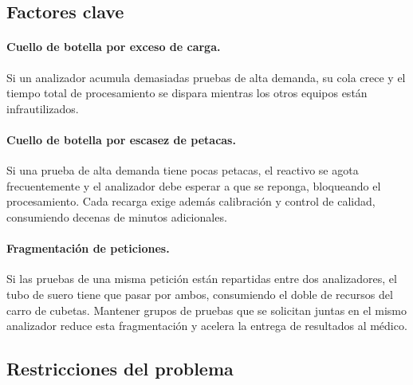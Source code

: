 \documentclass[12pt, a4paper]{article}
\begin{document}
\subsection{Factores clave}

\paragraph{Cuello de botella por exceso de carga.}
Si un analizador acumula demasiadas pruebas de alta demanda, su cola crece y el tiempo
total de procesamiento se dispara mientras los otros equipos están infrautilizados.

\paragraph{Cuello de botella por escasez de petacas.}
Si una prueba de alta demanda tiene pocas petacas, el reactivo se agota frecuentemente y
el analizador debe esperar a que se reponga, bloqueando el procesamiento. Cada recarga
exige además calibración y control de calidad, consumiendo decenas de minutos adicionales.

\paragraph{Fragmentación de peticiones.}
Si las pruebas de una misma petición están repartidas entre dos analizadores, el tubo de
suero tiene que pasar por ambos, consumiendo el doble de recursos del carro de cubetas.
Mantener grupos de pruebas que se solicitan juntas en el mismo analizador reduce esta
fragmentación y acelera la entrega de resultados al médico.

\subsection{Restricciones del problema}
\end{document}
